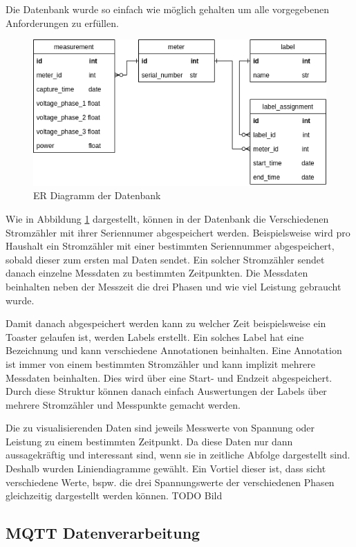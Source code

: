 Die Datenbank wurde so einfach wie möglich gehalten um alle vorgegebenen
Anforderungen zu erfüllen.

\begin{figure}[h]
    \centering
    \includegraphics[width=1.0\textwidth]{gfx/smic-db}
    \caption{
        ER Diagramm der Datenbank
    }
    \label{fig:smic-db}
\end{figure}

Wie in Abbildung \ref{fig:smic-db} dargestellt, können in der Datenbank
die Verschiedenen Stromzähler mit ihrer Seriennumer abgespeichert werden.
Beispielsweise wird pro Haushalt ein Stromzähler mit einer bestimmten
Seriennummer abgespeichert, sobald dieser zum ersten mal Daten sendet.
Ein solcher Stromzähler sendet danach einzelne Messdaten zu bestimmten
Zeitpunkten. Die Messdaten beinhalten neben der Messzeit die drei Phasen
und wie viel Leistung gebraucht wurde.

Damit danach abgespeichert werden kann zu welcher Zeit beispielsweise ein
Toaster gelaufen ist, werden Labels erstellt. Ein solches Label hat eine
Bezeichnung und kann verschiedene Annotationen beinhalten.
Eine Annotation ist immer von einem bestimmten Stromzähler und kann implizit mehrere
Messdaten beinhalten. Dies wird über eine Start- und Endzeit abgespeichert.
Durch diese Struktur können danach einfach Auswertungen der Labels über mehrere
Stromzähler und Messpunkte gemacht werden.


Die zu visualisierenden Daten sind jeweils Messwerte von Spannung oder Leistung zu einem bestimmten Zeitpunkt.
Da diese Daten nur dann aussagekräftig und interessant sind, wenn sie in zeitliche Abfolge dargestellt sind.
Deshalb wurden Liniendiagramme gewählt. Ein Vortiel dieser ist, dass sicht verschiedene Werte, bspw. die drei Spannungswerte der verschiedenen Phasen
gleichzeitig dargestellt werden können. TODO Bild

\subsection{\ac{MQTT} Datenverarbeitung}


